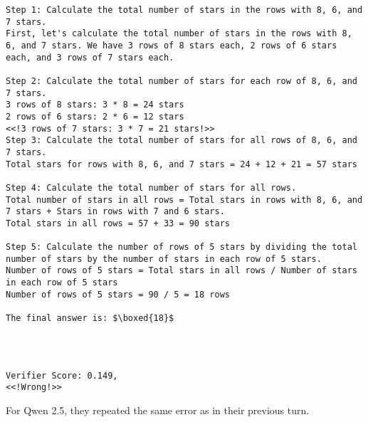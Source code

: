 \begin{lstlisting}
Step 1: Calculate the total number of stars in the rows with 8, 6, and 7 stars.
First, let's calculate the total number of stars in the rows with 8, 6, and 7 stars. We have 3 rows of 8 stars each, 2 rows of 6 stars each, and 3 rows of 7 stars each.

Step 2: Calculate the total number of stars for each row of 8, 6, and 7 stars.
3 rows of 8 stars: 3 * 8 = 24 stars
2 rows of 6 stars: 2 * 6 = 12 stars
<<!3 rows of 7 stars: 3 * 7 = 21 stars!>>
Step 3: Calculate the total number of stars for all rows of 8, 6, and 7 stars.
Total stars for rows with 8, 6, and 7 stars = 24 + 12 + 21 = 57 stars

Step 4: Calculate the total number of stars for all rows.
Total number of stars in all rows = Total stars in rows with 8, 6, and 7 stars + Stars in rows with 7 and 6 stars.
Total stars in all rows = 57 + 33 = 90 stars

Step 5: Calculate the number of rows of 5 stars by dividing the total number of stars by the number of stars in each row of 5 stars.
Number of rows of 5 stars = Total stars in all rows / Number of stars in each row of 5 stars
Number of rows of 5 stars = 90 / 5 = 18 rows

The final answer is: $\boxed{18}$




\end{lstlisting}

\begin{lstlisting}
Verifier Score: 0.149,
<<!Wrong!>> 
\end{lstlisting}
For Qwen 2.5, they repeated the same error as in their previous turn.







\newpage





